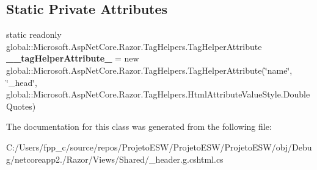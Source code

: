 \subsection*{Static Private Attributes}
\begin{DoxyCompactItemize}
\item 
\mbox{\label{class_asp_net_core_1_1_views___shared____header_a7455674a8d39d73fc4ff5a98cb3a26ef}} 
static readonly global\+::\+Microsoft.\+Asp\+Net\+Core.\+Razor.\+Tag\+Helpers.\+Tag\+Helper\+Attribute {\bfseries \+\_\+\+\_\+tag\+Helper\+Attribute\+\_} = new global\+::\+Microsoft.\+Asp\+Net\+Core.\+Razor.\+Tag\+Helpers.\+Tag\+Helper\+Attribute(\char`\"{}name\char`\"{}, \char`\"{}\+\_\+head\char`\"{}, global\+::\+Microsoft.\+Asp\+Net\+Core.\+Razor.\+Tag\+Helpers.\+Html\+Attribute\+Value\+Style.\+Double\+Quotes)
\end{DoxyCompactItemize}


The documentation for this class was generated from the following file\+:\begin{DoxyCompactItemize}
\item 
C\+:/\+Users/fpp\+\_\+c/source/repos/\+Projeto\+E\+S\+W/\+Projeto\+E\+S\+W/\+Projeto\+E\+S\+W/obj/\+Debug/netcoreapp2./\+Razor/\+Views/\+Shared/\+\_\+header.\+g.\+cshtml.\+cs\end{DoxyCompactItemize}
